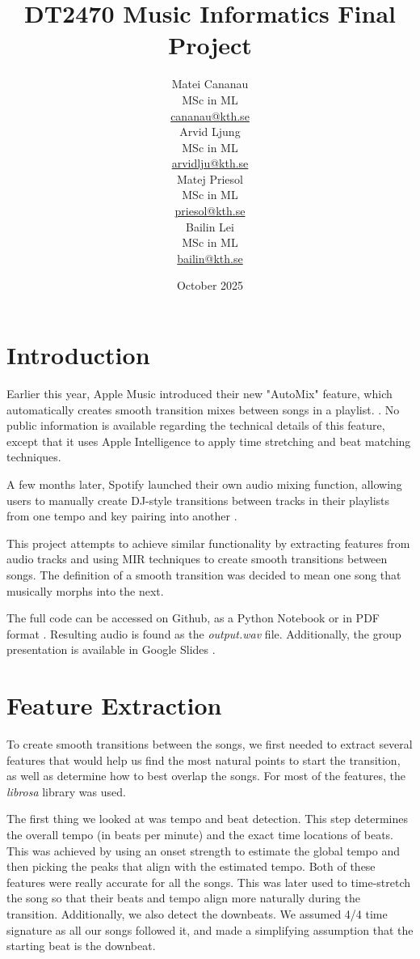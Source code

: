 \documentclass[12pt]{article}
\title{DT2470 Music Informatics Final Project}
\date{October 2025}
\author{
    \begin{minipage}[t]{0.24\textwidth}
        \centering
        Matei Cananau \\
        MSc in ML \\
        \href{mailto:cananau@kth.se}{cananau@kth.se}
    \end{minipage}
    \hfill
    \begin{minipage}[t]{0.24\textwidth}
        \centering
        Arvid Ljung \\
        MSc in ML \\
        \href{mailto:arvidlju@kth.se}{arvidlju@kth.se}
    \end{minipage}
    \hfill
    \begin{minipage}[t]{0.24\textwidth}
        \centering
        Matej Priesol \\
        MSc in ML \\
        \href{mailto:priesol@kth.se}{priesol@kth.se}
    \end{minipage}
    \hfill
    \begin{minipage}[t]{0.24\textwidth}
        \centering
        Bailin Lei \\
        MSc in ML \\
        \href{mailto:bailin@kth.se}{bailin@kth.se}
    \end{minipage}
}
\begin{document}
\maketitle

\tableofcontents

\newpage

\section{Introduction}

Earlier this year, Apple Music introduced their new "AutoMix" feature, which automatically creates smooth transition mixes between songs in a playlist. \cite{apple2025}. No public information is available regarding the technical details of this feature, except that it uses Apple Intelligence to apply time stretching and beat matching techniques.

A few months later, Spotify launched their own audio mixing function, allowing users to manually create DJ-style transitions between tracks in their playlists from one tempo and key pairing into another \cite{spotify2025}.

This project attempts to achieve similar functionality by extracting features from audio tracks and using MIR techniques to create smooth transitions between songs. The definition of a smooth transition was decided to mean one song that musically morphs into the next.

The full code can be accessed on Github, as a Python Notebook or in PDF format \cite{github_repo}. Resulting audio is found as the \textit{output.wav} file. Additionally, the group presentation is available in Google Slides \cite{presentation}.

\section{Feature Extraction}

To create smooth transitions between the songs, we first needed to extract several features that would help us find the most natural points to start the transition, as well as determine how to best overlap the songs. For most of the features, the \textit{librosa} library was used.

The first thing we looked at was tempo and beat detection. This step determines the overall tempo (in beats per minute) and the exact time locations of beats. This was achieved by using an onset strength to estimate the global tempo and then picking the peaks that align with the estimated tempo. Both of these features were really accurate for all the songs. This was later used to time-stretch the song so that their beats and tempo align more naturally during the transition. Additionally, we also detect the downbeats. We assumed 4/4 time signature as all our songs followed it, and made a simplifying assumption that the starting beat is the downbeat.
\end{document}
